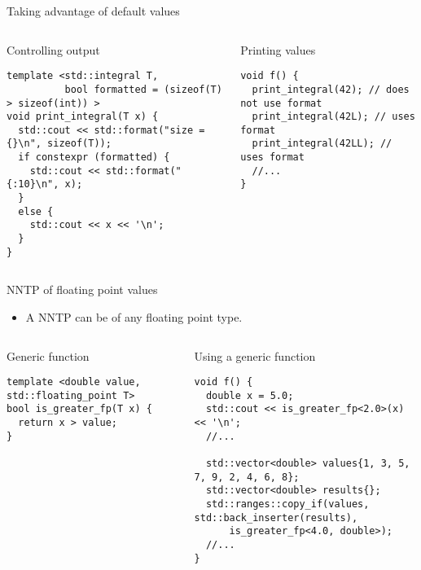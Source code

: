 \begin{frame}[t,fragile]{Taking advantage of default values}

\begin{columns}[T]

\begin{block}{Controlling output}
\begin{lstlisting}
template <std::integral T, 
          bool formatted = (sizeof(T) > sizeof(int)) >
void print_integral(T x) {
  std::cout << std::format("size = {}\n", sizeof(T));
  if constexpr (formatted) {
    std::cout << std::format("{:10}\n", x);
  }
  else {
    std::cout << x << '\n';
  }
}
\end{lstlisting}
\end{block}

\begin{block}{Printing values}
\begin{lstlisting}
void f() {
  print_integral(42); // does not use format
  print_integral(42L); // uses format
  print_integral(42LL); // uses format
  //...
}
\end{lstlisting}
\end{block}

\end{columns}

\end{frame}

\begin{frame}[t,fragile]{NNTP of floating point values}
\begin{itemize}
  \item A NNTP can be of any floating point type.
\end{itemize}

\begin{columns}[T]

\begin{block}{Generic function}
\begin{lstlisting}
template <double value, std::floating_point T>
bool is_greater_fp(T x) {
  return x > value;
}
\end{lstlisting}
\end{block}

\begin{block}{Using a generic function}
\begin{lstlisting}
void f() {
  double x = 5.0;
  std::cout << is_greater_fp<2.0>(x) << '\n';
  //...

  std::vector<double> values{1, 3, 5, 7, 9, 2, 4, 6, 8};
  std::vector<double> results{};
  std::ranges::copy_if(values, std::back_inserter(results), 
      is_greater_fp<4.0, double>);
  //...
}
\end{lstlisting}
\end{block}

\end{columns}
\end{frame}


